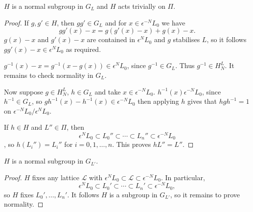 \documentclass[a4paper, 11pt]{report}
\begin{document}
\begin{lemma}
$H$ is a normal subgroup in $G_L$ and $H$ acts trivially on $\Pi$.
\end{lemma}
\begin{proof}
If $g,g'\in H$, then $gg'\in G_L$ and for $x\in\epsilon^{-N} L_0$ we have
\begin{equation*}
gg'(x)-x = g(g'(x) - x) + g(x) - x.
\end{equation*}
$g(x) - x$ and $g'(x) - x$ are contained in $\epsilon^N L_0$ and $g$ stabilises $L$, so it follows $gg'(x) - x \in \epsilon^N L_0$ as required.

$g^{-1}(x) - x = g^{-1}(x - g(x)) \in\epsilon^N L_0$, since $g^{-1}\in G_L$. Thus $g^{-1}\in H_N^L$. It remains to check normality in $G_L$.

Now suppose $g\in H_N^L$, $h\in G_L$ and take $x\in\epsilon^{-N} L_0$. $h^{-1}(x) \epsilon^{-N} L_0$, since $h^{-1}\in G_L$, so $gh^{-1}(x) - h^{-1}(x)\in\epsilon^{-N} L_0$ then applying $h$ gives that $hgh^{-1}=1$ on $\epsilon^{-N} L_0/{\epsilon^N L_0}$.

If $h\in H$ and $L''\in\Pi$, then
\begin{equation*}
\epsilon^N L_0 \subset L_0''\subset\cdots\subset L_n''\subset \epsilon^{-N} L_0
\end{equation*},
so $h(L_i'') = L_i''$ for $i=0,1,\ldots,n$. This proves $h L'' = L''$.
\end{proof}

\begin{lemma}
$H$ is a normal subgroup in $G_{L'}$.
\end{lemma}
\begin{proof}
$H$ fixes any lattice $\mathcal{L}$ with $\epsilon^N L_0\subset \mathcal{L}\subset \epsilon^{-N} L_0$. In particular,
\begin{equation*}
\epsilon^N L_0 \subset L_0'\subset\cdots\subset L_n'\subset \epsilon^{-N} L_0,
\end{equation*}
so $H$ fixes $L_0',\ldots, L_n'$. It follows $H$ is a subgroup in $G_{L'}$, so it remains to prove normality.
\end{proof}
\end{document}
